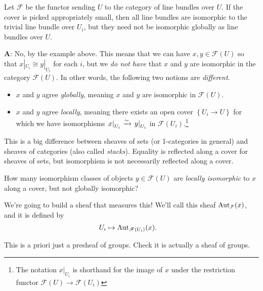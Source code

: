 \documentclass[11pt]{amsart}
\begin{document}
\begin{example} Let $\mathcal{F}$ be the functor sending $U$ to the category of line bundles over $U$. If the cover is picked appropriately small, then all line bundles are isomorphic to the trivial line bundle over $U_i$, but they need not be isomorphic globally as line bundles over $U$.
\end{example}

\textbf{A}: No, by the example above. This means that we can have $x,y \in \mathcal{F}(U)$ so that $x|_{U_i} \cong y|_{U_i}$ for each $i$, but we \textit{do not have} that $x$ and $y$ are isomorphic in the category $\mathcal{F}(U)$. In other words, the following two notions are \textit{different}.
\begin{itemize}
    \item $x$ and $y$ agree \textit{globally}, meaning $x$ and $y$ are isomorphic in $\mathscr{F}(U)$.
    \item  $x$ and $y$ agree \textit{locally}, meaning there exists an open cover $\left\{ U_i \to U \right\}$ for which we have isomorphisms $\left. x \right|_{ U_i } \xrightarrow{\sim} \left. y \right|_{ U_i }$ in $\mathcal{F}(U_i)$.\footnote{%
    The notation $x|_{U_i}$ is shorthand for the image of $x$ under the restriction functor $\mathcal{F}(U) \to \mathcal{F}(U_i)$
    }
\end{itemize}


\begin{remark} This is a big difference between sheaves of sets (or 1-categories in general) and sheaves of categories (also called \textit{stacks}). Equality is reflected along a cover for sheaves of sets, but isomorphism is not necessarily reflected along a cover.
\end{remark}

\begin{question} How many isomorphism classes of objects $y\in \mathcal{F}(U)$ are \textit{locally isomorphic} to $x$ along a cover, but not globally isomorphic?
\end{question}

We're going to build a sheaf that measures this! We'll call this sheaf $\mathrm{Aut}_{\mathcal{F}}(x)$, and it is defined by
\begin{equation}\label{eqn:autx-torsor}
\begin{aligned}
    U_i &\mapsto \mathrm{Aut}_{\mathscr{F}(U_i)}(x).
\end{aligned}
\end{equation}
\begin{exercise} This is a priori just a presheaf of groups. Check it is actually a sheaf of groups.
\end{exercise}
\end{document}
